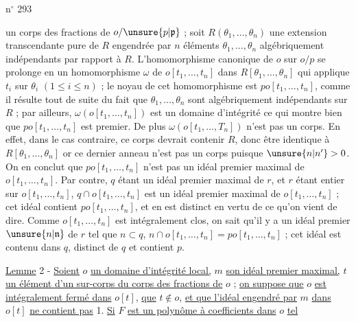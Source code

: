 \hfill n$^\circ$ 293

un corps des fractions de $o/\unsure{p|\mathfrak p}$ ; soit $R(\theta_1,\ldots,\theta_n)$ une extension transcendante pure de $R$ engendrée par $n$ éléments $\theta_1,\ldots,\theta_n$ algébriquement indépendants par rapport à $R$. L'homomorphisme canonique de $o$ sur $o/p$ se prolonge en un homomorphisme $\omega$ de $o[t_1,\ldots,t_n]$ dans $R[\theta_1,\ldots,\theta_n]$ qui applique $t_i$ sur $\theta_i$ $(1\leq i\leq n)$ ; le noyau de cet homomorphisme est $po[t_1,\ldots,t_n]$, comme il résulte tout de suite du fait que $\theta_1,\ldots,\theta_n$ sont algébriquement indépendants sur $R$ ; par ailleurs, $\omega(o[t_1,\ldots,t_n])$ est un domaine d'intégrité ce qui montre bien que $po[t_1,\ldots,t_n]$ est premier. De plus $\omega(o[t_1,\ldots,T_n])$ n'est pas un corps. En effet, dans le cas contraire, ce corps devrait contenir $R$, donc être identique à $R[\theta_1,\ldots,\theta_n]$ or ce dernier anneau n'est pas un corps puisque $\unsure{n|n'}>0$. On en conclut que $po[t_1,\ldots,t_n]$ n'est pas un idéal premier maximal de $o[t_1,\ldots,t_n]$. Par contre, $q$ étant un idéal premier maximal de $r$, et $r$ étant entier sur $o[t_1,\ldots,t_n]$, $q\cap o[t_1,\ldots,t_n]$ est un idéal premier maximal de $o[t_1,\ldots,t_n]$ ; cet idéal contient $po[t_1,\ldots,t_n]$, et en est distinct en vertu de ce qu'on vient de dire. Comme $o[t_1,\ldots,t_n]$ est intégralement clos, on sait qu'il y a un idéal premier $\unsure{n|\mathfrak n}$ de $r$ tel que $n\subset q$, $n\cap o[t_1,\ldots,t_n]=po[t_1,\ldots,t_n]$ ; cet idéal est contenu dans $q$, distinct de $q$ et contient $p$.

\uline{Lemme} 2 - \uline{Soient} $o$ \uline{un domaine d'intégrité local,} $m$ \uline{son idéal premier maximal,} $t$ \uline{un élément d'un sur-corps du corps des fractions de} $o$ ; \uline{on suppose que} $o$ \uline{est intégralement fermé dans} $o[t]$, \uline{que} $t\notin o$, \uline{et que l'idéal engendré par} $m$ \uline{dans} $o[t]$ \uline{ne contient pas} 1. \uline{Si} $F$ \uline{est un polynôme à coefficients dans} $o$ \uline{tel}
